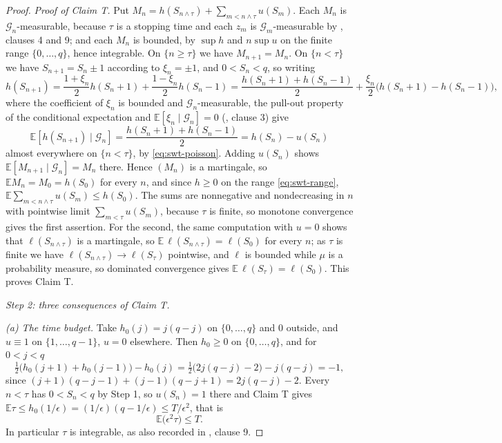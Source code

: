 \begin{proof}
\emph{Proof of Claim T.} Put
$M_n=h(S_{n\wedge\tau})+\sum_{m<n\wedge\tau}u(S_m)$. Each $M_n$ is
$\mathcal G_n$-measurable, because $\tau$ is a stopping time and each $z_m$ is
$\mathcal G_m$-measurable by , clauses 4 and 9; and each
$M_n$ is bounded, by $\sup h$ and $n\sup u$ on the finite range
$\{0,\ldots,q\}$, hence integrable. On $\{n\ge\tau\}$ we have
$M_{n+1}=M_n$. On $\{n<\tau\}$ we have $S_{n+1}=S_n\pm1$ according to
$\xi_n=\pm1$, and $0<S_n<q$, so writing
\[
  h(S_{n+1})=\frac{1+\xi_n}{2}h(S_n+1)+\frac{1-\xi_n}{2}h(S_n-1)
   =\frac{h(S_n+1)+h(S_n-1)}{2}
     +\frac{\xi_n}{2}\bigl(h(S_n+1)-h(S_n-1)\bigr),
\]
where the coefficient of $\xi_n$ is bounded and $\mathcal G_n$-measurable, the
pull-out property of the conditional expectation and
$\mathbb E[\xi_n\mid\mathcal G_n]=0$ (, clause 3) give
\[
  \mathbb E[h(S_{n+1})\mid\mathcal G_n]
   =\frac{h(S_n+1)+h(S_n-1)}{2}=h(S_n)-u(S_n)
\]
almost everywhere on $\{n<\tau\}$, by \eqref{eq:swt-poisson}. Adding
$u(S_n)$ shows $\mathbb E[M_{n+1}\mid\mathcal G_n]=M_n$ there. Hence $(M_n)$ is
a martingale, so $\mathbb E M_n=M_0=h(S_0)$ for every $n$, and since $h\ge0$ on
the range \eqref{eq:swt-range},
$\mathbb E\sum_{m<n\wedge\tau}u(S_m)\le h(S_0)$. The sums are nonnegative and
nondecreasing in $n$ with pointwise limit $\sum_{m<\tau}u(S_m)$, because $\tau$
is finite, so monotone convergence gives the first assertion. For the second,
the same computation with $u=0$ shows that $\ell(S_{n\wedge\tau})$ is a
martingale, so $\mathbb E\,\ell(S_{n\wedge\tau})=\ell(S_0)$ for every $n$; as
$\tau$ is finite we have $\ell(S_{n\wedge\tau})\to\ell(S_\tau)$ pointwise, and
$\ell$ is bounded while $\mu$ is a probability measure, so dominated convergence
gives $\mathbb E\,\ell(S_\tau)=\ell(S_0)$. This proves Claim T.

\emph{Step 2: three consequences of Claim T.}

\emph{(a) The time budget.} Take $h_0(j)=j(q-j)$ on $\{0,\ldots,q\}$ and $0$
outside, and $u\equiv1$ on $\{1,\dots,q-1\}$, $u=0$ elsewhere. Then $h_0\ge0$ on
$\{0,\dots,q\}$, and for $0<j<q$
\[
  \tfrac12\bigl(h_0(j+1)+h_0(j-1)\bigr)-h_0(j)
   =\tfrac12\bigl(2j(q-j)-2\bigr)-j(q-j)=-1,
\]
since $(j+1)(q-j-1)+(j-1)(q-j+1)=2j(q-j)-2$. Every $n<\tau$ has
$0<S_n<q$ by Step 1, so $u(S_n)=1$ there and Claim T gives
$\mathbb E\tau\le h_0(1/\epsilon)=(1/\epsilon)(q-1/\epsilon)\le T/\epsilon^2$,
that is
\begin{equation}\label{eq:swt-timebudget}
  \mathbb E\bigl(\epsilon^2\tau\bigr)\le T .
\end{equation}
In particular $\tau$ is integrable, as also recorded in
, clause 9.


\end{proof}
